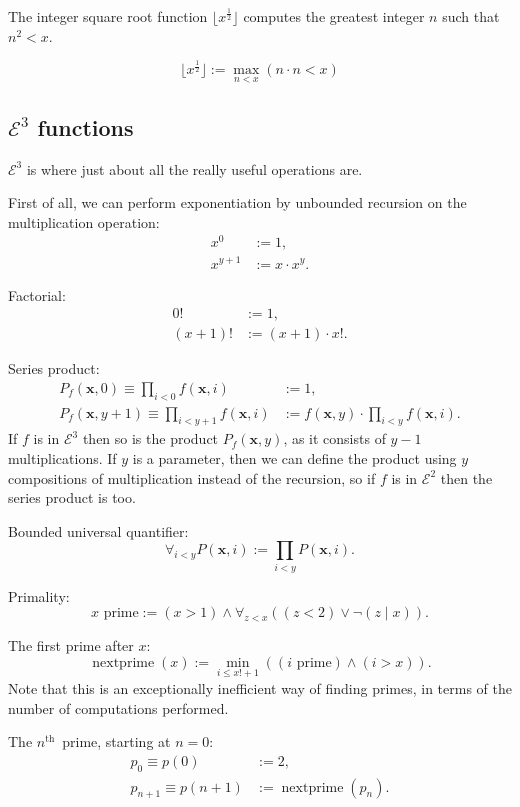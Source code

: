 \documentclass[a4paper]{article}
\newcommand{\grz}[1]{$\mathcal{E}^{#1}$}	%
\newcommand{\nth}{$n^{\textrm{th}}$~}	%
\newcommand{\xvec}{\mathbf{x}}	%
\newcommand{\recur}[1]{\begin{equation} \begin{split} #1 \end{split} \end{equation}}	%
\theoremstyle{plain}
\theoremstyle{definition}
\begin{document}
The integer square root function $\lfloor x^{\frac{1}{2}} \rfloor$ computes the greatest integer $n$ such that $n^2 < x$.

\[ \lfloor x^{\frac{1}{2}} \rfloor := \max_{n < x}{\left ( n \cdot n < x \right )} \]

\subsection{\grz{3} functions}
\grz{3} is where just about all the really useful operations are.

First of all, we can perform exponentiation by unbounded recursion on the multiplication operation:
\recur{
	x^0 &:= 1,				\\
	x^{y+1} &:= x \cdot x^y.
}

Factorial:
\recur{
	0! &:= 1,	\\
	(x+1)! &:= (x+1) \cdot x!.
}

Series product:
\recur{
	P_f(\xvec,0) \equiv \prod_{i < 0} f(\xvec,i) &:= 1,	\\
	P_f(\xvec,y+1) \equiv \prod_{i < y+1} f(\xvec,i) &:= f(\xvec,y) \cdot \prod_{i < y} f(\xvec, i).
}
If $f$ is in \grz{3} then so is the product $P_f(\xvec,y)$, as it consists of $y-1$ multiplications. If $y$ is a parameter, then we can define the product using $y$ compositions of multiplication instead of the recursion, so if $f$ is in \grz{2} then the series product is too.

Bounded universal quantifier:
\begin{equation} \forall_{i < y} P(\xvec,i) := \prod_{i < y} P(\xvec,i). \end{equation}

Primality:
\begin{equation} x \textrm{ prime} :=  (x > 1) \wedge \forall_{z < x} \left( (z < 2) \vee \neg (z \mid x) \right). \end{equation}

The first prime after $x$:
\begin{equation} \operatorname{nextprime}(x) := \min_{i \leq x!+1} \left( (i \textrm{ prime}) \wedge (i > x) \right). \end{equation}
Note that this is an exceptionally inefficient way of finding primes, in terms of the number of computations performed. 

The \nth prime, starting at $n=0$:
\recur{
	p_0 \equiv p(0) &:= 2,		\\
	p_{n+1} \equiv p(n+1) &:= \operatorname{nextprime} (p_n).
}
\end{document}
